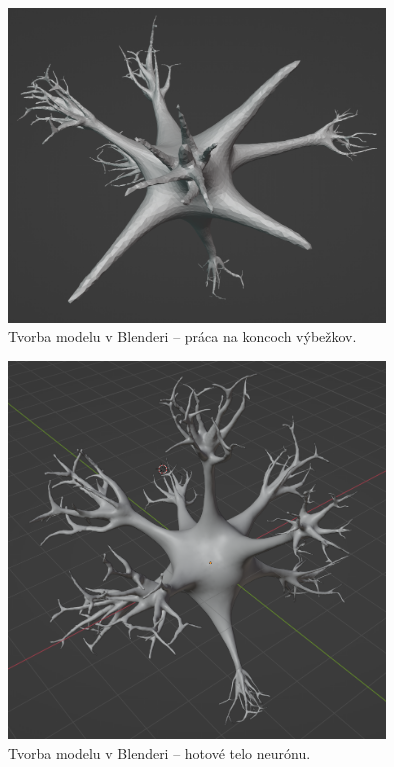 \begin{figure}[!htbp]
  \centering
  \includegraphics[width=10cm]{img/n2-crop.png}
  \caption{Tvorba modelu v Blenderi {--} práca na koncoch výbežkov.}
  \label{blender2}
\end{figure}	

\begin{figure}[!htbp]
  \centering
  \includegraphics[width=10cm]{img/n3-crop.png}
  \caption{Tvorba modelu v Blenderi {--} hotové telo neurónu.}
  \label{blender3}
\end{figure}	

